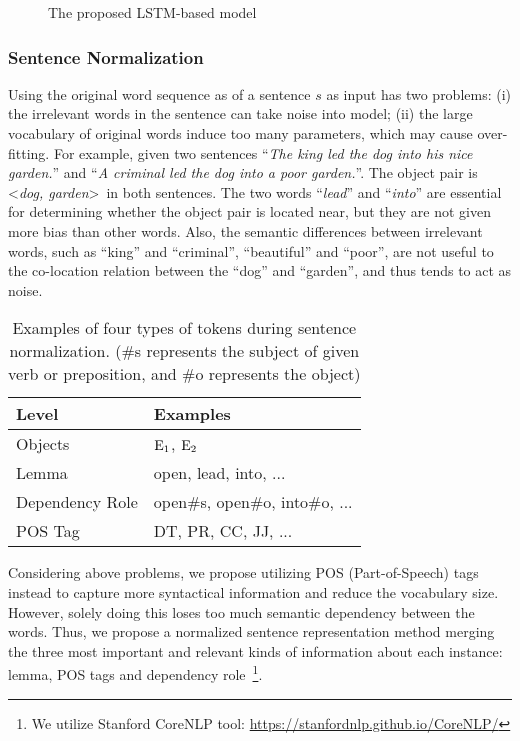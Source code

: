 \begin{figure*}[th]
	\centering
	\caption{The proposed LSTM-based model}
	\label{fig:LSTM}
\end{figure*}

\subsubsection{Sentence Normalization}
Using the original word sequence as of a sentence $s$ as input has two problems:
(i) the irrelevant words in the sentence can take noise into model; 
(ii) the large vocabulary of original words induce too many parameters, which may cause over-fitting.
For example, given two sentences 
``\textit{The king led the dog into his nice garden.}'' and 
``\textit{A criminal led the dog into a poor garden.}''. 
The object pair is \textless \textit{dog, garden}\textgreater~in 
both sentences.
The two words ``\textit{lead}'' and ``\textit{into}'' are essential
for determining whether the object pair is located near, but they are not given more bias than other words. 
Also, the semantic differences between irrelevant words, such as ``king'' and ``criminal'', ``beautiful'' and ``poor'', are not useful to the co-location
relation between the ``dog'' and ``garden'', and 
thus tends to act as noise.

\begin{table}[th]
	\centering
	\small
	\begin{tabular}{l|l}
		\hline
		\textbf{Level}	&  \textbf{Examples}\\ 		\hline
		Objects	& $\textnormal{E}_1$, $\textnormal{E}_2$ \\ 		\hline
		Lemma & open, lead, into, ...\\ \hline 
		Dependency Role	& open\#s, open\#o, into\#o, ... \\ 		\hline 
		POS Tag	& DT, PR, CC, JJ, ... \\ 		\hline 
	\end{tabular}
	\caption{Examples of four types of tokens during sentence normalization. (\#s represents the subject of given verb or preposition, and \#o represents the object)}
	\label{tab:norm}
\end{table}

Considering above problems, we propose utilizing POS (Part-of-Speech) tags instead to capture more syntactical information and reduce the vocabulary size. 
However, solely doing this loses too much semantic dependency between the words. 
Thus, we propose a normalized sentence representation method merging the three most important and relevant kinds of information about each instance: lemma, POS tags and dependency role~\footnote{We utilize Stanford CoreNLP tool: \url{https://stanfordnlp.github.io/CoreNLP/}}. 

